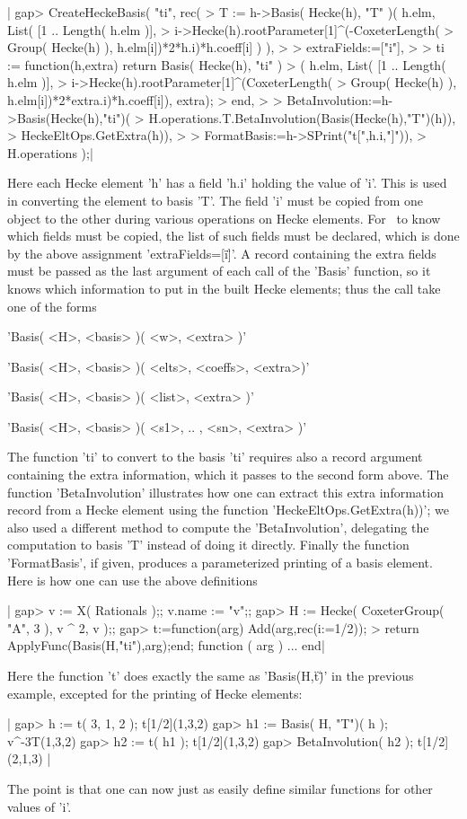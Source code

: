 |    gap> CreateHeckeBasis( "ti", rec(
    > T := h->Basis( Hecke(h), "T" )( h.elm, List( [1 .. Length( h.elm )],
    >  i->Hecke(h).rootParameter[1]^(-CoxeterLength(
    >          Group( Hecke(h) ), h.elm[i])*2*h.i)*h.coeff[i] ) ),
    >
    > extraFields:=["i"],
    >
    > ti := function(h,extra) return Basis( Hecke(h), "ti" )
    >    ( h.elm, List( [1 .. Length( h.elm )],
    >    i->Hecke(h).rootParameter[1]^(CoxeterLength(
    >        Group( Hecke(h) ), h.elm[i])*2*extra.i)*h.coeff[i]), extra);
    >    end,
    >
    > BetaInvolution:=h->Basis(Hecke(h),"ti")(
    >   H.operations.T.BetaInvolution(Basis(Hecke(h),"T")(h)),
    >   HeckeEltOps.GetExtra(h)),
    >
    > FormatBasis:=h->SPrint("t[",h.i,"]")),
    > H.operations );|

Here  each Hecke element  'h' has a  field 'h.i' holding  the value of 'i'.
This  is used in converting the element to basis 'T'. The field 'i' must be
copied  from one  object to  the other  during various  operations on Hecke
elements.  For \CHEVIE\ to  know which fields  must be copied,  the list of
such  fields  must  be  declared,  which  is  done  by the above assignment
'extraFields\:=[\"i\"]'.  A  record  containing  the  extra  fields must be
passed  as the last  argument of each  call of the  'Basis' function, so it
knows  which information to put in the  built Hecke elements; thus the call
take one of the forms

'Basis( <H>, <basis> )( <w>, <extra> )'

'Basis( <H>, <basis> )( <elts>, <coeffs>, <extra>)'

'Basis( <H>, <basis> )( <list>, <extra> )'

'Basis( <H>, <basis> )( <s1>, .. , <sn>, <extra> )'

The  function 'ti'  to convert  to the  basis 'ti'  requires also  a record
argument  containing the extra  information, which it  passes to the second
form  above. The function 'BetaInvolution'  illustrates how one can extract
this  extra  information  record  from  a  Hecke element using the function
'HeckeEltOps.GetExtra(h))';  we also used a different method to compute the
'BetaInvolution',  delegating the computation to basis 'T' instead of doing
it  directly.  Finally  the  function  'FormatBasis',  if given, produces a
parameterized  printing of  a basis  element. Here  is how  one can use the
above definitions\:

|    gap> v := X( Rationals );; v.name := "v";;
    gap> H := Hecke( CoxeterGroup( "A", 3 ), v ^ 2, v );;
    gap> t:=function(arg) Add(arg,rec(i:=1/2));
    >  return ApplyFunc(Basis(H,"ti"),arg);end;
    function ( arg ) ... end|

Here  the function  't' does  exactly the  same as  'Basis(H,\"t\")' in the
previous example, excepted for the printing of Hecke elements:

|    gap> h := t( 3, 1, 2 );
    t[1/2](1,3,2)
    gap> h1 := Basis( H, "T")( h );
    v^-3T(1,3,2)
    gap> h2 := t( h1 );
    t[1/2](1,3,2)
    gap> BetaInvolution( h2 );
    t[1/2](2,1,3) |

The  point is that one can now  just as easily define similar functions for
other values of 'i'.

